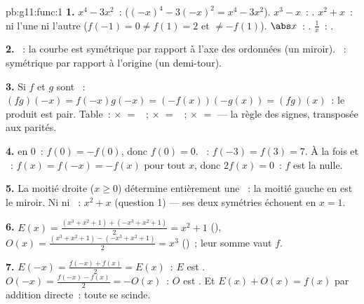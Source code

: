 \begin{solution}{pb:g11:func:1}
\textbf{1.} $x^4 - 3x^2$~:  ($(-x)^4 - 3(-x)^2 = x^4 -
3x^2$). $x^3 - x$~: . $x^2 + x$~: ni l'une ni l'autre
($f(-1) = 0 \neq f(1) = 2$ et $\neq -f(1)$). $\abs x$~: .
$\frac1x$~: .

\textbf{2.} ~: la courbe est symétrique par rapport à l'axe des
ordonnées (un miroir). ~: symétrique par rapport à l'origine
(un demi-tour).

\textbf{3.} Si $f$ et $g$ sont ~:
$(fg)(-x) = f(-x)g(-x) = (-f(x))(-g(x)) = (fg)(x)$~: le produit est
pair. Table~:  $\times$  $=$ ~;  $\times$
 $=$ ~;  $\times$  $=$  --- la
règle des signes, transposée aux parités.

\textbf{4.}  en $0$~: $f(0) = -f(0)$, donc $f(0) = 0$.
~: $f(-3) = f(3) = 7$. À la fois  et ~:
$f(x) = f(-x) = -f(x)$ pour tout $x$, donc $2f(x) = 0$~: $f$ est la
 nulle.

\textbf{5.} La moitié droite ($x \geq 0$) détermine entièrement une
~: la moitié gauche en est le miroir. Ni  ni
~: $x^2 + x$ (question 1) --- ses deux symétries échouent
en $x = 1$.

\textbf{6.} $E(x) = \frac{(x^3 + x^2 + 1) + (-x^3 + x^2 +
1)}{2} = x^2 + 1$ (), $O(x) = \frac{(x^3 + x^2 + 1) -
(-x^3 + x^2 + 1)}{2} = x^3$ ()~; leur somme vaut $f$.

\textbf{7.} $E(-x) = \frac{f(-x) + f(x)}{2} = E(x)$~: $E$ est .
$O(-x) = \frac{f(-x) - f(x)}{2} = -O(x)$~: $O$ est . Et
$E(x) + O(x) = f(x)$ par addition directe~: toute  se
scinde.


\end{solution}
